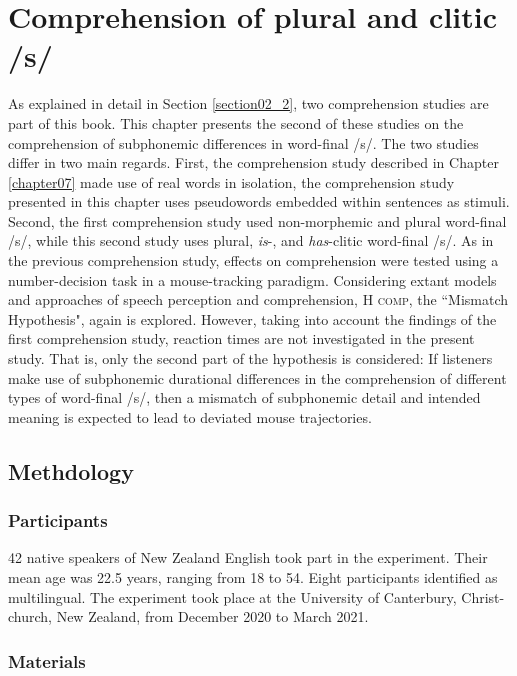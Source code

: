 \chapter{Comprehension of plural and clitic /s/}\label{chapter08}

As explained in detail in Section \ref{section02_2}, two comprehension studies are part of this book. This chapter presents the second of these studies on the comprehension of subphonemic differences in word-final /s/. The two studies differ in two main regards. First, the comprehension study described in Chapter \ref{chapter07} made use of real words in isolation, the comprehension study presented in this chapter uses pseudowords embedded within sentences as stimuli. Second, the first comprehension study used non-morphemic and plural word-final /s/, while this second study uses plural, \textit{is}-, and \textit{has}-clitic word-final /s/. As in the previous comprehension study, effects on comprehension were tested using a number-decision task in a mouse-tracking paradigm. Considering extant models and approaches of speech perception and comprehension, \textsc{H comp}, the ``Mismatch Hypothesis", again is explored. However, taking into account the findings of the first comprehension study, reaction times are not investigated in the present study. That is, only the second part of the hypothesis is considered: If listeners make use of subphonemic durational differences in the comprehension of different types of word-final /s/, then a mismatch of subphonemic detail and intended meaning is expected to lead to deviated mouse trajectories.

\section{Methdology}\label{section08_1}

\subsection{Participants}\label{section08_1_1}

42 native speakers of New Zealand English took part in the experiment. Their mean age was 22.5 years, ranging from 18 to 54. Eight participants identified as multilingual. The experiment took place at the University of Canterbury, Christ-church, New Zealand, from December 2020 to March 2021.

\subsection{Materials}\label{section08_1_2}

